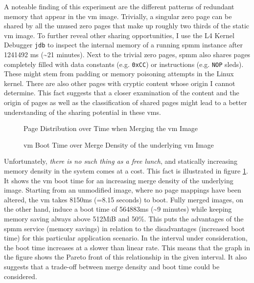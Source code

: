 A noteable finding of this experiment are the different patterns of redundant memory that appear in the \ac{vm} image.
Trivially, a singular zero page can be shared by all the unused zero pages that make up roughly two thirds of the static \ac{vm} image.
To further reveal other sharing opportunities, I use the L4 Kernel Debugger \texttt{jdb} to inspect the internal memory of a running \ac{spmm} instance after 1241492 ms (\textasciitilde{}21 minutes).
Next to the trivial zero pages, \ac{spmm} also shares pages completely filled with data constants (e.g. \texttt{0xCC}) or instructions (e.g. \texttt{NOP} sleds).
These might stem from padding or memory poisoning attempts in the Linux kernel.
There are also other pages with cryptic content whose origin I cannot determine.
This fact suggests that a closer examination of the content and the origin of pages as well as the classification of shared pages might lead to a better understanding of the sharing potential in these \acp{vm}.

\begin{figure}
  \centering
  
  \caption{Page Distribution over Time when Merging the \acs{vm} Image}
  \label{fig:page-distribution-vm}
  \centering
  
  \caption{\acs{vm} Boot Time over Merge Density of the underlying \ac{vm} Image}
  \label{fig:boot-time-vm}
\end{figure}

Unfortunately, \emph{there is no such thing as a free lunch}, and statically increasing memory density in the system comes at a cost.
This fact is illustrated in figure \ref{fig:boot-time-vm}.
It shows the \ac{vm} boot time for an increasing merge density of the underlying image.
Starting from an unmodified image, where no page mappings have been altered, the \ac{vm} takes 8150ms (=8.15 seconds) to boot.
Fully merged images, on the other hand, induce a boot time of 564883ms (\textasciitilde{}9 minutes) while keeping memory saving always above 512MiB and 50\%.
This puts the advantages of the \ac{spmm} service (memory savings) in relation to the disadvantages (increased boot time) for this particular application scenario.
In the interval under consideration, the boot time increases at a slower than linear rate.
This means that the graph in the figure shows the Pareto front of this relationship in the given interval.
It also suggests that a trade-off between merge density and boot time could be considered.

